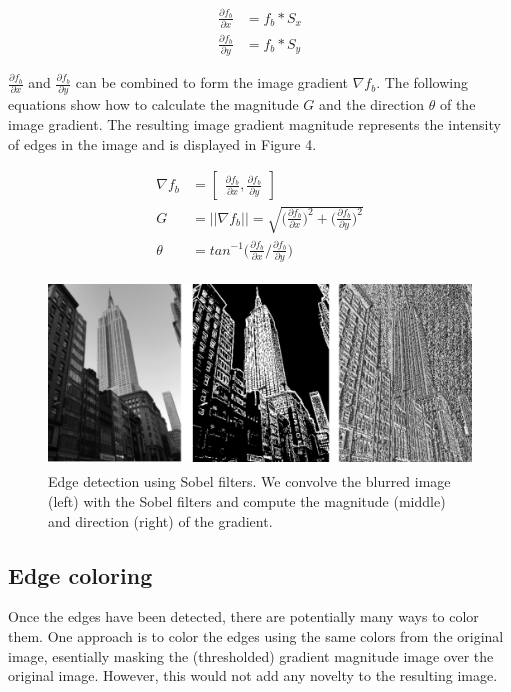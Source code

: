 \documentclass[runningheads]{llncs}
\begin{document}
\begin{align}
\frac{\partial f_b}{\partial x} &= f_b * S_x \\
\frac{\partial f_b}{\partial y} &= f_b * S_y
\end{align}

$\frac{\partial f_b}{\partial x}$ and $\frac{\partial f_b}{\partial y}$ can be combined to form the image gradient $\nabla f_b$. The following equations show how to calculate the magnitude $G$ and the direction $\theta$ of the image gradient. The resulting image gradient magnitude represents the intensity of edges in the image and is displayed in Figure 4. 

\begin{align}
\nabla f_b &= \begin{bmatrix} \frac{\partial f_b}{\partial x}, \frac{\partial f_b}{\partial y} \end{bmatrix} \\
G &= \vert \vert \nabla f_b \vert \vert = \sqrt{\Big( \frac{\partial f_b}{\partial x} \Big)^2 + \Big( \frac{\partial f_b}{\partial y} \Big)^2} \\
\theta &= tan^{-1} \Big(\frac{\partial f_b}{\partial x} / \frac{\partial f_b}{\partial y}\Big)
\end{align}

\begin{figure}
\centering
\includegraphics[height=5cm]{images/edge.png}
\caption{Edge detection using Sobel filters. We convolve the blurred image (left) with the Sobel filters and compute the magnitude (middle) and direction (right) of the gradient.}
\label{fig:example}
\end{figure}

\subsection{Edge coloring}

Once the edges have been detected, there are potentially many ways to color them. One approach is to color the edges using the same colors from the original image, esentially masking the (thresholded) gradient magnitude image over the original image. However, this would not add any novelty to the resulting image.
\end{document}
